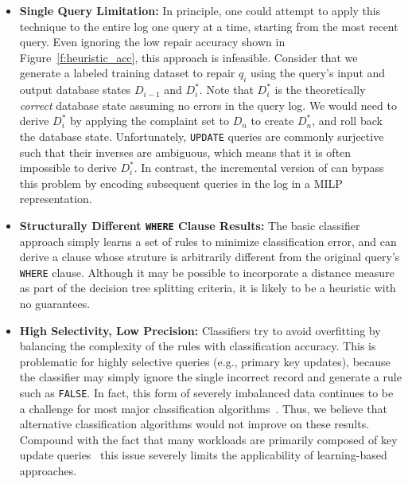 \begin{itemize}[itemsep=1pt, leftmargin=5mm]
\item \textbf{Single Query Limitation: }
In principle, one could attempt to apply this technique to the
entire log one query at a time, starting from the most recent query.
Even ignoring the low repair accuracy shown in Figure~\ref{f:heuristic_acc},
this approach is infeasible.
Consider that we generate a labeled training dataset to repair $q_i$ 
using the query's input and output database states $D_{i-1}$ and $D_i^*$.
Note that $D_i^*$ is the theoretically \emph{correct} database state assuming no errors in the query log.
We would need to derive $D_i^*$ by applying the complaint set to $D_n$ to create $D_n^*$, and roll back the database state.
Unfortunately, \texttt{UPDATE} queries are commonly surjective such
that their inverses are ambiguous, which means that it is often
impossible to derive $D_i^*$. In contrast, the incremental version of
\sys can bypass this problem by encoding subsequent queries in the log
in a MILP representation.


\item \textbf{Structurally Different \texttt{WHERE} Clause Results: } 
The basic classifier approach simply learns a set of rules to minimize
classification error, and can derive a clause whose struture is arbitrarily 
different from the original query's \texttt{WHERE} clause.
Although it may be possible to incorporate a distance measure as part of the decision tree
splitting criteria, it is likely to be a heuristic with no guarantees.


\item \textbf{High Selectivity, Low Precision: }
Classifiers try to avoid overfitting by balancing the complexity of the rules with classification accuracy.
This is problematic for highly selective queries (e.g., primary key updates), because the classifier
may simply ignore the single incorrect record and generate a rule such as \texttt{FALSE}.
In fact, this form of severely imbalanced data continues to be a challenge for most major classification algorithms~\cite{he2009learning, galar2012review}. 
Thus, we believe that alternative classification algorithms would not improve on these results. 
Compound with the fact that many workloads are primarily composed of
key update queries~\cite{oltpbench} this issue severely limits the
applicability of learning-based approaches.

\end{itemize}


